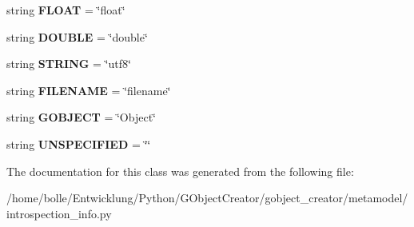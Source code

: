 \begin{DoxyCompactItemize}
\item 
\hypertarget{classgobject__creator_1_1metamodel_1_1introspection__info_1_1DataType_a9dbe1ebb5cb5d891e4fbaa463c468070}{
string {\bfseries FLOAT} = \char`\"{}float\char`\"{}}
\label{classgobject__creator_1_1metamodel_1_1introspection__info_1_1DataType_a9dbe1ebb5cb5d891e4fbaa463c468070}

\item 
\hypertarget{classgobject__creator_1_1metamodel_1_1introspection__info_1_1DataType_a6449e81a8890839b2cb2ec0e8f83c586}{
string {\bfseries DOUBLE} = \char`\"{}double\char`\"{}}
\label{classgobject__creator_1_1metamodel_1_1introspection__info_1_1DataType_a6449e81a8890839b2cb2ec0e8f83c586}

\item 
\hypertarget{classgobject__creator_1_1metamodel_1_1introspection__info_1_1DataType_a0aa2c6df373b6d25fe33b93c5076b5f6}{
string {\bfseries STRING} = \char`\"{}utf8\char`\"{}}
\label{classgobject__creator_1_1metamodel_1_1introspection__info_1_1DataType_a0aa2c6df373b6d25fe33b93c5076b5f6}

\item 
\hypertarget{classgobject__creator_1_1metamodel_1_1introspection__info_1_1DataType_a119cd51b8b9e42ada61456cf09c7e607}{
string {\bfseries FILENAME} = \char`\"{}filename\char`\"{}}
\label{classgobject__creator_1_1metamodel_1_1introspection__info_1_1DataType_a119cd51b8b9e42ada61456cf09c7e607}

\item 
\hypertarget{classgobject__creator_1_1metamodel_1_1introspection__info_1_1DataType_a73d2c43861e0b7262a8cca1ec760e1ad}{
string {\bfseries GOBJECT} = \char`\"{}Object\char`\"{}}
\label{classgobject__creator_1_1metamodel_1_1introspection__info_1_1DataType_a73d2c43861e0b7262a8cca1ec760e1ad}

\item 
\hypertarget{classgobject__creator_1_1metamodel_1_1introspection__info_1_1DataType_a5a63f8c7d808d057165447c963a923a0}{
string {\bfseries UNSPECIFIED} = \char`\"{}\char`\"{}}
\label{classgobject__creator_1_1metamodel_1_1introspection__info_1_1DataType_a5a63f8c7d808d057165447c963a923a0}

\end{DoxyCompactItemize}


The documentation for this class was generated from the following file:\begin{DoxyCompactItemize}
\item 
/home/bolle/Entwicklung/Python/GObjectCreator/gobject\_\-creator/metamodel/introspection\_\-info.py\end{DoxyCompactItemize}
